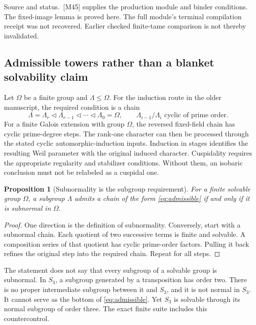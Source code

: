 \documentclass[11pt]{article}
\newtheorem{proposition}{Proposition}[section]
\theoremstyle{definition}\newtheorem{definition}[proposition]{Definition}
\newcommand{\source}[1]{\par{\small\textsf{Source and status.}\ #1}\par}
\begin{document}
\source{[M45] supplies the production module and binder conditions. The fixed-image lemma is proved here. The full module's terminal compilation receipt was not recovered. Earlier checked finite-tame comparison is not thereby invalidated.}

\subsection{Admissible towers rather than a blanket solvability claim}
Let $\Omega$ be a finite group and $\Lambda\leq\Omega$. For the induction route in the older manuscript, the required condition is a chain
\[
 \Lambda=\Lambda_r\triangleleft\Lambda_{r-1}
 \triangleleft\cdots\triangleleft\Lambda_0=\Omega,
 \qquad \Lambda_{i-1}/\Lambda_i\text{ cyclic of prime order}.
 \tag{14.1}\label{eq:admissible}
\]
For a finite Galois extension with group $\Omega$, the reversed fixed-field chain has cyclic prime-degree steps. The rank-one character can then be processed through the stated cyclic automorphic-induction inputs. Induction in stages identifies the resulting Weil parameter with the original induced character. Cuspidality requires the appropriate regularity and stabilizer conditions. Without them, an isobaric conclusion must not be relabeled as a cuspidal one.

\begin{proposition}[Subnormality is the subgroup requirement]\label{prop:admissible}
For a finite solvable group $\Omega$, a subgroup $\Lambda$ admits a chain of the form \eqref{eq:admissible} if and only if it is subnormal in $\Omega$.
\end{proposition}
\begin{proof}
One direction is the definition of subnormality. Conversely, start with a subnormal chain. Each quotient of two successive terms is finite and solvable. A composition series of that quotient has cyclic prime-order factors. Pulling it back refines the original step into the required chain. Repeat for all steps.
\end{proof}

The statement does not say that every subgroup of a solvable group is subnormal. In $S_3$, a subgroup generated by a transposition has order two. There is no proper intermediate subgroup between it and $S_3$, and it is not normal in $S_3$. It cannot serve as the bottom of \eqref{eq:admissible}. Yet $S_3$ is solvable through its normal subgroup of order three. The exact finite suite includes this countercontrol.
\end{document}
